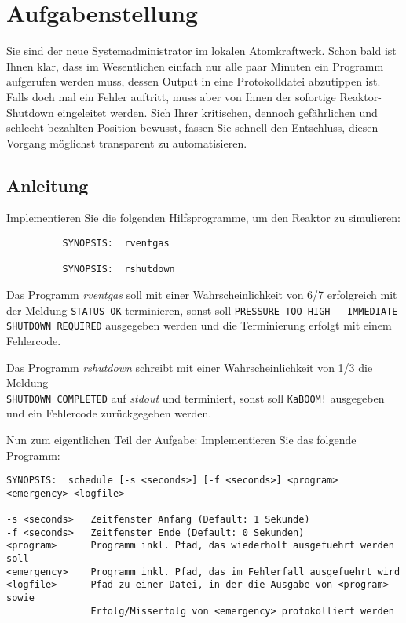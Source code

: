 




\section*{Aufgabenstellung}

Sie sind der neue Systemadministrator im lokalen Atomkraftwerk. Schon bald ist
Ihnen klar, dass im Wesentlichen einfach nur alle paar Minuten ein Programm
aufgerufen werden muss, dessen Output in eine Protokolldatei abzutippen ist.
Falls doch mal ein Fehler auftritt, muss aber von Ihnen der sofortige
Reaktor-Shutdown eingeleitet werden. Sich Ihrer kritischen, dennoch gefährlichen
und schlecht bezahlten Position bewusst, fassen Sie schnell den Entschluss,
diesen Vorgang möglichst transparent zu automatisieren.

\subsection*{Anleitung}
Implementieren Sie die folgenden Hilfsprogramme, um den Reaktor zu simulieren:

\begin{verbatim}
          SYNOPSIS:  rventgas

          SYNOPSIS:  rshutdown
\end{verbatim}

Das Programm \emph{rventgas} soll mit einer Wahrscheinlichkeit von 6/7
erfolgreich mit der Meldung \verb_STATUS OK_ terminieren, sonst soll
\verb_PRESSURE TOO HIGH - IMMEDIATE SHUTDOWN REQUIRED_ ausgegeben werden und die
Terminierung erfolgt mit einem Fehlercode.

Das Programm \emph{rshutdown} schreibt mit einer Wahrscheinlichkeit von 1/3 die
Meldung\\
\verb_SHUTDOWN COMPLETED_ auf \emph{stdout} und terminiert, sonst soll
\verb_KaBOOM!_ ausgegeben und ein Fehlercode zurückgegeben werden.

Nun zum eigentlichen Teil der Aufgabe: Implementieren Sie das folgende Programm:

\begin{verbatim}
SYNOPSIS:  schedule [-s <seconds>] [-f <seconds>] <program> <emergency> <logfile>

-s <seconds>   Zeitfenster Anfang (Default: 1 Sekunde)
-f <seconds>   Zeitfenster Ende (Default: 0 Sekunden)
<program>      Programm inkl. Pfad, das wiederholt ausgefuehrt werden soll
<emergency>    Programm inkl. Pfad, das im Fehlerfall ausgefuehrt wird
<logfile>      Pfad zu einer Datei, in der die Ausgabe von <program> sowie
               Erfolg/Misserfolg von <emergency> protokolliert werden
\end{verbatim}

